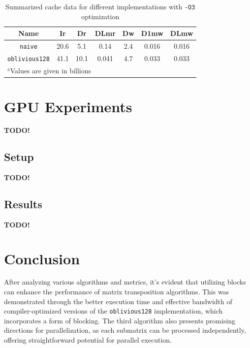 \documentclass[conference]{IEEEtran}
\begin{document}
    \begin{table}[htbp]
        \caption{Summarized cache data for different implementations with \texttt{-O3} optimization}
        \begin{center}
            \begin{tabular}{ | c | c | c | c | c | c | c |}
                \hline  
                Name                    & Ir    & Dr    & DLmr  & Dw    & D1mw  & DLmw \\
                \hline  
                \texttt{naive}          & 20.6  & 5.1   & 0.14  & 2.4   & 0.016 & 0.016\\ 
                \hline  
                \texttt{oblivious128}   & 41.1  & 10.1  & 0.041 & 4.7   & 0.033 & 0.033\\      
                \hline  
            \multicolumn{4}{l}{$^{\mathrm{a}}$Values are given in billions}     
            \end{tabular}       
        \end{center}
        \label{tab:cache_data}
    \end{table}

    \section{GPU Experiments}
    \textbf{TODO!}\\

    \subsection{Setup}
    \textbf{TODO!}\\

    \subsection{Results}
    \textbf{TODO!}\\

    \section{Conclusion}
    After analyzing various algorithms and metrics, it's evident that utilizing blocks can enhance the performance of matrix transposition algorithms. This was demonstrated through the better execution time and effective bandwidth of compiler-optimized versions of the \texttt{oblivious128} implementation, which incorporates a form of blocking. The third algorithm also presents promising directions for parallelization, as each submatrix can be processed independently, offering straightforward potential for parallel execution.

    \newpage
    \printbibliography
\end{document}
